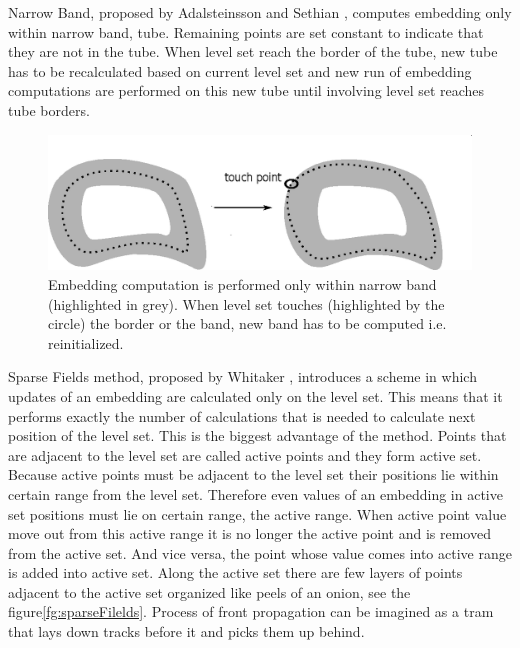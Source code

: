 Narrow Band, proposed by Adalsteinsson and Sethian \cite{sethianFastLS}, computes embedding only within narrow band, tube.
Remaining points are set constant to indicate that they are not in the tube.
When level set reach the border of the tube, new tube has to be recalculated based on current level set and new run of embedding computations are performed on this new tube until involving level set reaches tube borders.

\begin{figure}
    \centering
    \includegraphics[width=\textwidth]{data/narrowBands}
    \caption[Narrow band computation illustration]{Embedding computation is performed only within narrow band (highlighted in grey). When level set touches (highlighted by the circle) the border or the band, new band has to be computed i.e. reinitialized.}
    \label{fg:narrowBands}
\end{figure}

\par
Sparse Fields method, proposed by Whitaker \cite{sparseFilelds}, introduces a scheme in which updates of an embedding are calculated only on the level set.
This means that it performs exactly the number of calculations that is needed to calculate next position of the level set.
This is the biggest advantage of the method. Points that are adjacent to the level set are called active points and they form active set.
Because active points must be adjacent to the level set their positions lie within certain range from the level set.
Therefore even values of an embedding in active set positions must lie on certain range, the active range.
When active point value move out from this active range it is no longer the active point and is removed from the active set.
And vice versa, the point whose value comes into active range is added into active set.
Along the active set there are few layers of points adjacent to the active set organized like peels of an onion, see the figure\ref{fg:sparseFilelds}.
Process of front propagation can be imagined as a tram that lays down tracks before it and picks them up behind.

